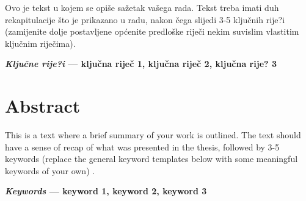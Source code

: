 \vspace{5pt}

\noindent
Ovo je tekst u kojem se opiše sažetak vašega rada. Tekst treba imati duh rekapitulacije što je prikazano u radu, nakon čega slijedi 3-5 ključnih rije?i (zamijenite dolje postavljene općenite predloške riječi nekim suvislim vlastitim ključnim riječima).

\vspace{5pt}
%
\noindent \textbf{\textit{Ključne rije?i} --- ključna riječ 1, ključna riječ 2, ključna rije? 3} 




\section*{Abstract}
\vspace{-10pt}
This is a text where a brief summary of your work is outlined. The text should have a sense of recap of what was presented in the thesis, followed by 3-5 keywords (replace the general keyword templates below with some meaningful keywords of your own) .

\vspace{5pt}
%
\noindent \textbf{\textit{Keywords} --- keyword 1, keyword 2, keyword 3}


